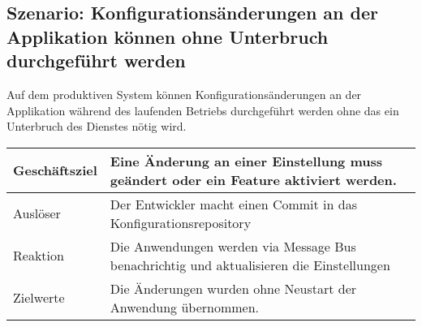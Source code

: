 \subsection{Szenario: Konfigurationsänderungen an der Applikation können ohne Unterbruch durchgeführt werden}

Auf dem produktiven System können Konfigurationsänderungen an der Applikation während des laufenden Betriebs durchgeführt werden ohne das ein Unterbruch des Dienstes nötig wird.

\begin{table}[H]
	\centering
	\begin{tabular}{ | p{3cm} | p{11cm} | }
		\toprule
		Geschäftsziel & Eine Änderung an einer Einstellung muss geändert oder ein Feature aktiviert werden. \\ \hline
		Auslöser & Der Entwickler macht einen Commit in das Konfigurationsrepository\\ \hline
		Reaktion & Die Anwendungen werden via Message Bus benachrichtig und aktualisieren die Einstellungen \\ \hline
		Zielwerte & Die Änderungen wurden ohne Neustart der Anwendung übernommen.\\
		\bottomrule
	\end{tabular}
\end{table}